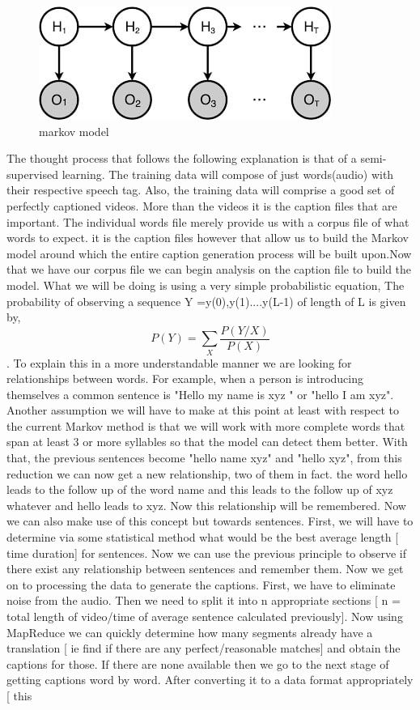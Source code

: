 \documentclass[sigconf]{acmart}
\begin{document}
\begin{figure}[!ht]
  \centering\includegraphics[width=\columnwidth]{images/markovmodel.jpg}
  \caption{markov model}\label{f:markov}
\end{figure} 
The thought process that follows the following explanation is that of a semi-supervised learning. The training data will compose of just words(audio) with their respective speech tag. Also, the training data will comprise a good set of perfectly captioned videos. More than the videos it is the caption files that are important. The individual words file merely provide us with a corpus file of what words to expect. it is the caption files however that allow us to build the Markov model around which the entire caption generation process will be built upon.Now that we have our corpus file we can begin analysis on the caption file to build the model. What we will be doing is using a very simple probabilistic equation\cite{Wikipedia2017a}, The probability of observing a sequence Y =y(0),y(1)....y(L-1) of length of L is given by, \[ P(Y) = \sum_{X}^{} \frac{P(Y/X)}{P(X)} \] . To explain this in a more understandable manner we are looking for relationships between words. For example, when a person is introducing themselves a common sentence is "Hello my name is xyz " or "hello I am xyz". Another assumption we will have to make at this point at least with respect to the current Markov method is that we will work with more complete words that span at least 3 or more syllables so that the model can detect them better. With that, the previous sentences become "hello name xyz" and "hello xyz", from this reduction we can now get a new relationship, two of them in fact. the word hello leads to the follow up of the word name and this leads to the follow up of xyz whatever and hello leads to xyz. Now this relationship will be remembered. Now we can also make use of this concept but towards sentences. First, we will have to determine via some statistical method what would be the best average length [ time duration] for sentences. Now we can use the previous principle to observe if there exist any relationship between sentences and remember them. Now we get on to processing the data to generate the captions. First, we have to eliminate noise from the audio. Then we need to split it into n appropriate sections [ n = total length of video/time of average sentence calculated previously].  Now using MapReduce we can quickly determine how many segments already have a translation [ ie find if there are any perfect/reasonable matches] and obtain the captions for those. If there are none available then we go to the next stage of getting captions word by word. After converting it to a data format appropriately [ this 
\end{document}
